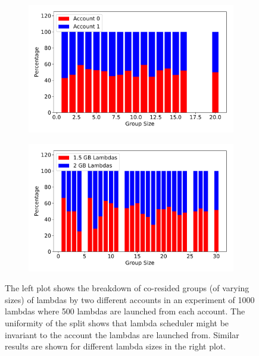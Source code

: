 \begin{figure}[!t]
    \begin{subfigure}{.5\textwidth}
      \centering
      \includegraphics[width=.99\linewidth]{fig/different-accounts.pdf}
    \end{subfigure}%
    \begin{subfigure}{.5\textwidth}
      \centering
      \includegraphics[width=.99\linewidth]{fig/different-sizes.pdf}
    \end{subfigure}

    \caption{The left plot shows the breakdown of co-resided groups (of varying sizes) of lambdas by 
        two different accounts in an experiment of 1000 lambdas where 500 lambdas are launched from 
        each account. The uniformity of the split shows that lambda scheduler might be invariant 
        to the account the lambdas are launched from. Similar results are shown for different lambda 
        sizes in the right plot. }
    \label{fig:factors}
\end{figure}


